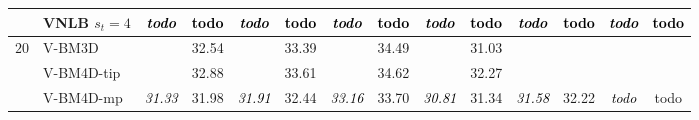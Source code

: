 \documentclass[10pt, journal, twocolumn, final, a4paper]{IEEEtran}
\newcommand{\best}[1]{#1}
\newcommand{\bsic}[1]{\textcolor{black}{\textit{#1}}}
\newcommand{\Bsic}[1]{\textcolor{black}{\textbf{\textit{#1}}}}
\newcommand{\Best}[1]{\textbf{\textcolor{black}{#1}}}
\begin{document}
\begin{table}[htp!]
\begin{center}
{\begin{tabular}{ c | l |c c | c c | c c | c c | c c | c c}
			                      & VNLB   $s_t = 4$     & \Bsic{todo } & \Best{todo } & \Bsic{todo } & \Best{todo } & \Bsic{todo } & \Best{todo } & \Bsic{todo } & \Best{todo } & \Bsic{todo } & \Best{todo } & \Bsic{todo } & \Best{todo } \\\hline
%                                                                                                                                                                                                                                         
			\multirow{1}{*}{$20$}
			                      & V-BM3D               & \bsic{     } &       32.54  & \bsic{     } &       33.39  & \bsic{     } &       34.49  & \bsic{     } &       31.03  & \bsic{     } &              & \bsic{     } &              \\
			                      & V-BM4D-tip           & \bsic{     } & \best{32.88} & \bsic{     } & \best{33.61} & \bsic{     } & \best{34.62} & \bsic{     } & \best{32.27} & \bsic{     } & \best{     } & \bsic{     } & \best{     } \\
			                      & V-BM4D-mp            & \bsic{31.33} &       31.98  & \bsic{31.91} &       32.44  & \bsic{33.16} &       33.70  & \bsic{30.81} &       31.34  & \bsic{31.58} &       32.22  & \bsic{todo } &       todo   \\

\end{tabular}}
\end{center}
\end{table}
\end{document}
